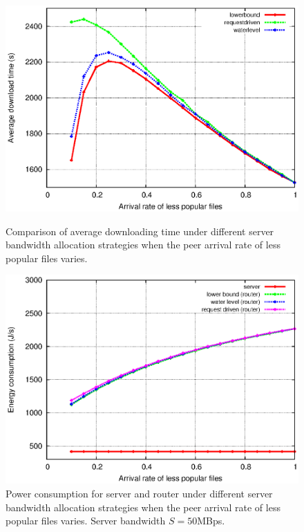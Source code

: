 \documentclass[conference]{IEEEtran}
\begin{document}
\begin{figure}[htp!]
\centering
\begin{minipage}[b]{0.3\linewidth}
	\includegraphics[scale=0.4]{graphs/pop.eps}
	\caption{Comparison of average downloading time under different server bandwidth allocation strategies when the peer arrival rate of less popular files varies.}
	\label{fig:popsimulation}
\end{minipage}
\hfill
\centering
\begin{minipage}[b]{0.3\linewidth}
	\includegraphics[scale=0.4]{graphs/componentconsumption.eps}
	\caption{Power consumption for server and router under different server bandwidth allocation strategies when the peer arrival rate of less popular files varies. Server bandwidth $S=50$MBps.}
	\label{fig:componentpop}
\end{minipage}

\end{figure}
\end{document}
